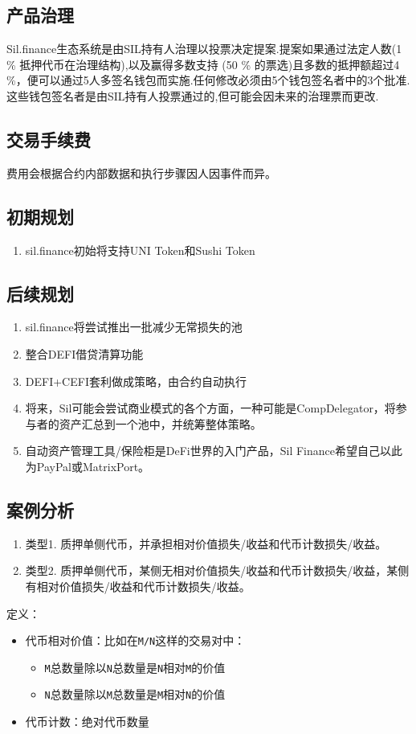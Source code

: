 \documentclass[11pt,letterpaper]{article}
\begin{document}
\begin{multicols}{2}
\subsection{产品治理}
Sil.finance生态系统是由SIL持有人治理以投票决定提案.提案如果通过法定人数(1 \% 抵押代币在治理结构),以及赢得多数支持 (50 \% 的票选)且多数的抵押额超过4 \%，便可以通过5人多签名钱包而实施.任何修改必须由5个钱包签名者中的3个批准.这些钱包签名者是由SIL持有人投票通过的,但可能会因未来的治理票而更改.

\subsection{交易手续费}
费用会根据合约内部数据和执行步骤因人因事件而异。

\subsection{初期规划}
\begin{enumerate}
  \item sil.finance初始将支持UNI Token和Sushi Token
\end{enumerate}

\subsection{后续规划}
\begin{enumerate}
  \item sil.finance将尝试推出一批减少无常损失的池
  \item 整合DEFI借贷清算功能
  \item DEFI+CEFI套利做成策略，由合约自动执行
  \item 将来，Sil可能会尝试商业模式的各个方面，一种可能是CompDelegator，将参与者的资产汇总到一个池中，并统筹整体策略。
  \item 自动资产管理工具/保险柜是DeFi世界的入门产品，Sil Finance希望自己以此为PayPal或MatrixPort。
\end{enumerate}

\subsection{案例分析}
\begin{enumerate}
  \item 类型1. 质押单侧代币，并承担相对价值损失/收益和代币计数损失/收益。
  \item 类型2. 质押单侧代币，某侧无相对价值损失/收益和代币计数损失/收益，某侧有相对价值损失/收益和代币计数损失/收益。
\end{enumerate}
定义：
\begin{itemize}
  \item 代币相对价值：比如在\texttt{M/N}这样的交易对中：
  \begin{itemize}
    \item \texttt{M}总数量除以\texttt{N}总数量是\texttt{N}相对\texttt{M}的价值
    \item \texttt{N}总数量除以\texttt{M}总数量是\texttt{M}相对\texttt{N}的价值
  \end{itemize}
  \item 代币计数：绝对代币数量
\end{itemize}


\end{multicols}
\end{document}
